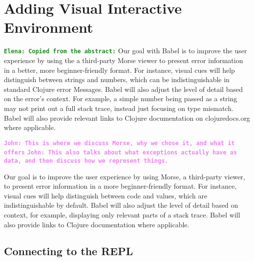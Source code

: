 \documentclass[12pt]{article}
\newcommand{\comment}[1]{{\bf \tt  {#1}}}
\newcommand{\emcomment}[1]{\textcolor{ForestGreen}{\comment{Elena: {#1}}}}
\newcommand{\jwcomment}[1]{\textcolor{violet}{\comment{John: {#1}}}}
\begin{document}
\section{Adding Visual Interactive Environment}\label{sec:interactive}
\emcomment{Copied from the abstract:}
Our goal with Babel is to improve the user experience by using the a third-party Morse viewer to present error information in a better, more beginner-friendly format. 
For instance, visual cues will help distinguish between strings and numbers, which can be indistinguishable in standard Clojure error Messages. 
Babel will also adjust the level of detail based on the error’s context. 
For example, a simple number being passed as a string may not print out a full stack trace, instead just focusing on type mismatch. 
Babel will also provide relevant links to Clojure documentation on clojuredocs.org where applicable.

\jwcomment{This is where we discuss Morse, why we chose it, and what it offers}
\jwcomment{This also talks about what exceptions actually have as data, and then discuss how we 
represent things.}

Our goal is to improve the user experience by using Morse, a third-party viewer, to present error information in a more beginner-friendly format. 
For instance, visual cues will help distinguish between code and values, which are indistinguishable by default. 
Babel will also adjust the level of detail based on context, for example, displaying only relevant parts of a stack trace. 
Babel will also provide links to Clojure documentation where applicable.

\subsection{Connecting to the REPL}\label{subsec:connect-to-REPL}
\end{document}
